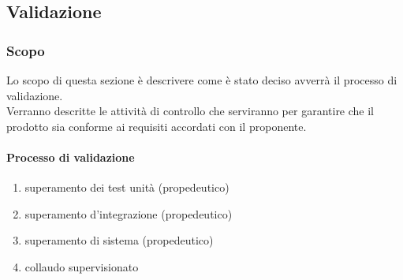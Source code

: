 \subsection{Validazione}
\subsubsection{Scopo}

Lo scopo di questa sezione è descrivere come è stato deciso avverrà il processo di validazione.\\
Verranno descritte le attività di controllo che serviranno per garantire che il prodotto sia conforme ai requisiti accordati con il proponente.\\

\paragraph{Processo di validazione}
\begin{enumerate}
    \item superamento dei test unità (propedeutico)
    \item superamento d'integrazione (propedeutico)
    \item superamento di sistema (propedeutico)
    \item collaudo supervisionato
\end{enumerate}